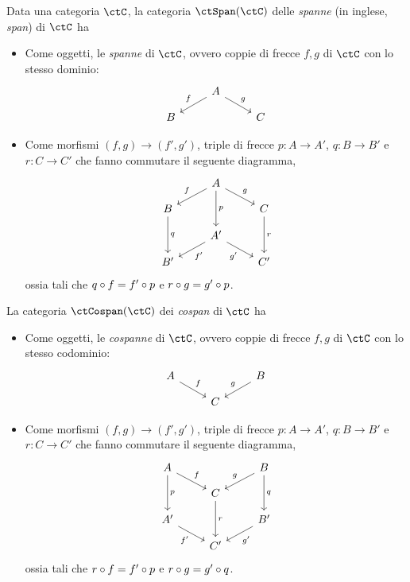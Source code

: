 \begin{definition}\label{def_span_e_cospan}
  Data una categoria \(\ctC\), la categoria \(\ctSpan(\ctC)\) delle \emph{spanne} (in inglese, \emph{span}) di \(\ctC\) ha
	\begin{itemize}
    \item Come oggetti, le \emph{spanne} di \(\ctC\), ovvero coppie di frecce \(f,g\) di \(\ctC\) con lo stesso dominio:
      \[
			      \begin{tikzcd}[row sep=small]
				      & A \ar{dl}[swap]{f} \ar{dr}{g} \\
				      B && C
			      \end{tikzcd}
		      \]
		\item Come morfismi \((f,g)\to (f',g')\), triple di frecce \(p:A\to A'\), \(q:B\to B'\) e \(r:C\to C'\) che fanno commutare il seguente diagramma,
		      \[
			      \begin{tikzcd}[row sep=small]
				      & A \ar{dd}{p} \ar{dl}[swap]{f} \ar{dr}{g} \\
				      B \ar{dd}{q} && C \ar{dd}{r} \\
				      & A' \ar{dl}{f'} \ar{dr}[swap]{g'} \\
				      B' && C'
			      \end{tikzcd}
		      \]
		      ossia tali che \(q\circ f=f'\circ p\) e \(r\circ g=g'\circ p\).
	\end{itemize}

	La categoria \(\ctCospan(\ctC)\) dei \emph{cospan} di \(\ctC\) ha
	\begin{itemize}
		\item Come oggetti, le \emph{cospanne} di \(\ctC\), ovvero coppie di frecce \(f,g\) di \(\ctC\) con lo stesso codominio:
		      \[
			      \begin{tikzcd}[row sep=small]
				      A \ar{dr}{f} && B \ar{dl}[swap]{g} \\
				      & C
			      \end{tikzcd}
		      \]
		\item Come morfismi \((f,g)\to (f',g')\), triple di frecce \(p:A\to A'\), \(q:B\to B'\) e \(r:C\to C'\) che fanno commutare il seguente diagramma,
		      \[
			      \begin{tikzcd}[row sep=small]
				      A \ar{dd}{p} \ar{dr}{f} && B \ar{dd}{q} \ar{dl}[swap]{g} \\
				      & C \ar{dd}{r} \\
				      A' \ar{dr}[swap]{f'} && B' \ar{dl}{g'} \\
				      & C'
			      \end{tikzcd}
		      \]
		      ossia tali che \(r\circ f=f'\circ p\) e \(r\circ g=g'\circ q\).
	\end{itemize}
\end{definition}
